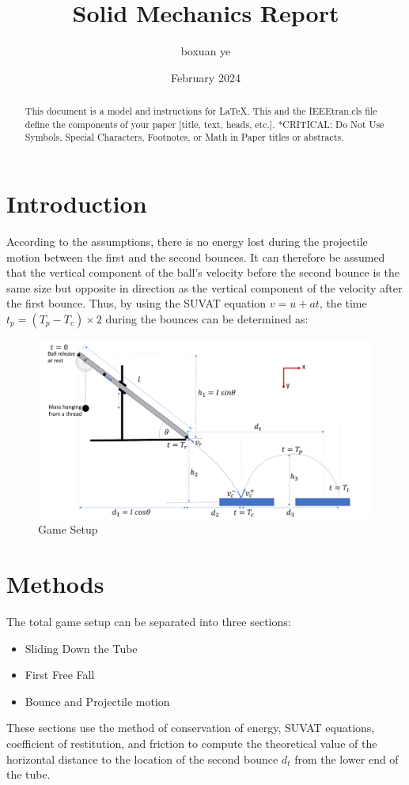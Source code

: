 \documentclass[conference]{IEEEtran}
\title{Solid Mechanics Report}
\author{boxuan ye}
\date{February 2024}
\begin{document}
\maketitle
\begin{abstract}
    This document is a model and instructions for \LaTeX.
    This and the IEEEtran.cls file define the components of your paper [title, text, heads, etc.]. *CRITICAL: Do Not Use Symbols, Special Characters, Footnotes, 
    or Math in Paper titles or abstracts.
\end{abstract}

\section{Introduction}
        According to the assumptions, there is no energy lost during the projectile motion between the first and the second bounces. It can therefore be assumed that the vertical component of the ball's velocity before the second bounce is the same size but opposite in direction as the vertical component of the velocity after the first bounce. Thus, by using the SUVAT equation $v = u + at$, the time $t_p = (T_p - T_c)\times2 $ during the bounces can be determined as:
\begin{figure}[H]
    \centering
    \includegraphics[width=1\linewidth]{Gamesetup.png}
    \caption{Game Setup}
    \label{fig:game_setup}
\end{figure}

\section{Methods}
    The total game setup can be separated into three sections:
    \begin{itemize}
        \item Sliding Down the Tube
        \item First Free Fall
        \item Bounce and Projectile motion
    \end{itemize}
    These sections use the method of conservation of energy, SUVAT equations, coefficient of restitution, and friction to compute the theoretical value of the horizontal distance to the location of the second bounce $d_t$ from the lower end of the tube.
    
\end{document}
